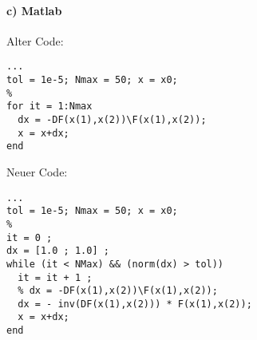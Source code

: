 \paragraph*{c) Matlab}
Alter Code:
\begin{verbatim}
...
tol = 1e-5; Nmax = 50; x = x0;
%
for it = 1:Nmax
  dx = -DF(x(1),x(2))\F(x(1),x(2));
  x = x+dx;
end
\end{verbatim}
Neuer Code:
\begin{verbatim}
...
tol = 1e-5; Nmax = 50; x = x0;
%
it = 0 ;
dx = [1.0 ; 1.0] ;
while (it < NMax) && (norm(dx) > tol))
  it = it + 1 ;
  % dx = -DF(x(1),x(2))\F(x(1),x(2));
  dx = - inv(DF(x(1),x(2))) * F(x(1),x(2));
  x = x+dx;
end
\end{verbatim}
